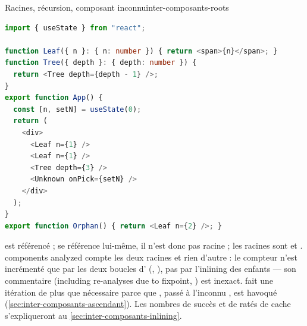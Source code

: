 \begin{exemple}{Racines, récursion, composant inconnu}{inter-composants-roots}
\begin{lstlisting}[language=TypeScript,caption={\file{/tmp/ch16/roots.tsx}},label={lst:inter-composants-roots}]
import { useState } from "react";

function Leaf({ n }: { n: number }) { return <span>{n}</span>; }
function Tree({ depth }: { depth: number }) {
  return <Tree depth={depth - 1} />;
}
export function App() {
  const [n, setN] = useState(0);
  return (
    <div>
      <Leaf n={1} />
      <Leaf n={1} />
      <Tree depth={3} />
      <Unknown onPick={setN} />
    </div>
  );
}
export function Orphan() { return <Leaf n={2} />; }
\end{lstlisting}
 est référencé ;  se référence lui-même, il n'est donc pas racine ; les
racines sont  et .  components analyzed\fg{} compte les deux
racines et rien d'autre : le compteur  n'est incrémenté que par les
deux boucles d' (,
), pas par l'inlining des enfants --- son commentaire
(\og including re-analyses due to fixpoint\fg, ) est
inexact.  fait une itération de plus que nécessaire parce que , passé à
l'inconnu , est havoqué (\cref{sec:inter-composants-ascendant}). Les nombres de
succès et de ratés de cache s'expliqueront au \cref{sec:inter-composants-inlining}.
\end{exemple}

